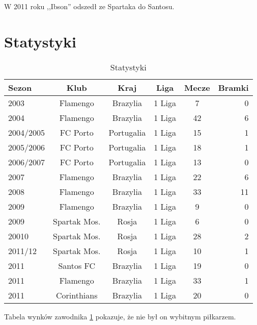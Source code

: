 \documentclass[a4paper,12pt]{article}
\begin{document}
W 2011 roku ,,Ibson'' odszedł ze Spartaka do Santosu.

\section{Statystyki}


\begin{table}[b]
\begin{tabular}{lccccr}
\hline
\textbf{Sezon}&\textbf{Klub}&\textbf{Kraj}&\textbf{Liga}&\textbf{Mecze}&\textbf{Bramki}\\
\hline
2003&Flamengo&Brazylia&1 Liga&7&0 \\
2004&Flamengo&Brazylia&1 Liga&42&6 \\
2004/2005&FC Porto&Portugalia&1 Liga&15&1 \\
2005/2006&FC Porto&Portugalia&1 Liga&18&1 \\
2006/2007&FC Porto&Portugalia&1 Liga&13&0 \\
2007&Flamengo&Brazylia&1 Liga&22&6 \\
2008&Flamengo&Brazylia&1 Liga&33&11 \\
2009&Flamengo&Brazylia&1 Liga&9&0 \\
2009&Spartak Mos.&Rosja&1 Liga&6&0 \\
20010&Spartak Mos.&Rosja&1 Liga&28&2 \\
2011/12&Spartak Mos.&Rosja&1 Liga&10&1 \\
2011&Santos FC&Brazylia&1 Liga&19&0 \\
2011&Flamengo&Brazylia&1 Liga&33&1 \\
2011&Corinthians&Brazylia&1 Liga&20&0 \\
\hline
\end{tabular}
\caption{Statystyki}
\label{tabela1}
\end{table}


Tabela wynków zawodnika \ref{tabela1} pokazuje, że nie był on wybitnym piłkarzem.
\end{document}
